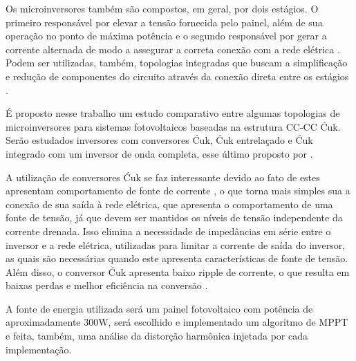 \documentclass[
	12pt,				%
	openright,			%
	onseside,
	a4paper,			%
	english,			%
	french,				%
	spanish,			%
	brazil,				%
	]{abntex2}
\begin{document}
	Os microinversores também são compostos, em geral, por dois estágios. O primeiro responsável por elevar a tensão fornecida pelo painel, além de sua operação no ponto de máxima potência e o segundo responsável por gerar a corrente alternada de modo a assegurar a correta conexão com a rede elétrica \cite{Nezamuddin_des_eff_micro}. Podem ser utilizadas, também, topologias integradas que buscam a simplificação e redução de componentes do circuito através da conexão direta entre os estágios \cite{LUIGI_int_top} \cite{LUIGIJUNIOR_ev_int}.

	
	É proposto nesse trabalho um estudo comparativo entre algumas topologias de microinversores para sistemas fotovoltaicos baseadas na estrutura CC-CC Ćuk. Serão estudados inversores com conversores Ćuk, Ćuk entrelaçado e Ćuk integrado com um inversor de onda completa, esse último proposto por \cite{LUIGI_int_top}.

	A utilização de conversores Ćuk se faz interessante devido ao fato de estes apresentam comportamento de fonte de corrente \cite{LUIGIJUNIOR_ev_int}, o que torna mais simples sua a conexão de sua saída à rede elétrica, que apresenta o comportamento de uma fonte de tensão, já que devem ser mantidos os níveis de tensão independente da corrente drenada. Isso elimina a necessidade de impedâncias em série entre o inversor e a rede elétrica, utilizadas para limitar a corrente de saída do inversor, as quais são necessárias quando este apresenta características de fonte de tensão. Além disso, o conversor Ćuk apresenta baixo ripple de corrente, o que resulta em baixas perdas e melhor eficiência na conversão \cite{Shawky_perform_anal}.



	A fonte de energia utilizada será um painel fotovoltaico com potência de aproximadamente 300W, será escolhido e implementado um algoritmo de MPPT e feita, também,  uma análise da distorção harmônica injetada por cada implementação.
%
%
%
\end{document}
